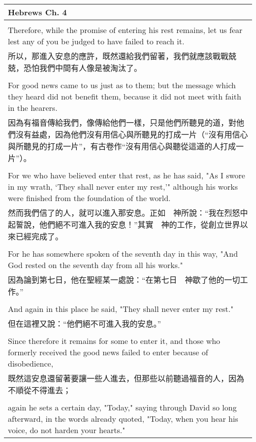 \newpage

\begin{tabularx}{\textwidth}{p{}}
\hline
Hebrews Ch. 4 \\
\hline \\
Therefore, while the promise of entering his rest remains, let us fear lest any of you be judged to have failed to reach it. \\
所以，那進入安息的應許，既然還給我們留著，我們就應該戰戰兢兢，恐怕我們中間有人像是被淘汰了。 \\ \\
For good news came to us just as to them; but the message which they heard did not benefit them, because it did not meet with faith in the hearers. \\
因為有福音傳給我們，像傳給他們一樣，只是他們所聽見的道，對他們沒有益處，因為他們沒有用信心與所聽見的打成一片（“沒有用信心與所聽見的打成一片”，有古卷作“沒有用信心與聽從這道的人打成一片”）。 \\ \\
For we who have believed enter that rest, as he has said, "As I swore in my wrath, `They shall never enter my rest,'" although his works were finished from the foundation of the world. \\
然而我們信了的人，就可以進入那安息。正如　神所說：“我在烈怒中起誓說，他們絕不可進入我的安息！”其實　神的工作，從創立世界以來已經完成了。 \\ \\
For he has somewhere spoken of the seventh day in this way, "And God rested on the seventh day from all his works." \\
因為論到第七日，他在聖經某一處說：“在第七日　神歇了他的一切工作。” \\ \\
And again in this place he said, "They shall never enter my rest." \\
但在這裡又說：“他們絕不可進入我的安息。” \\ \\
Since therefore it remains for some to enter it, and those who formerly received the good news failed to enter because of disobedience, \\
既然這安息還留著要讓一些人進去，但那些以前聽過福音的人，因為不順從不得進去； \\ \\
again he sets a certain day, "Today," saying through David so long afterward, in the words already quoted, "Today, when you hear his voice, do not harden your hearts." \\

\end{tabularx}
